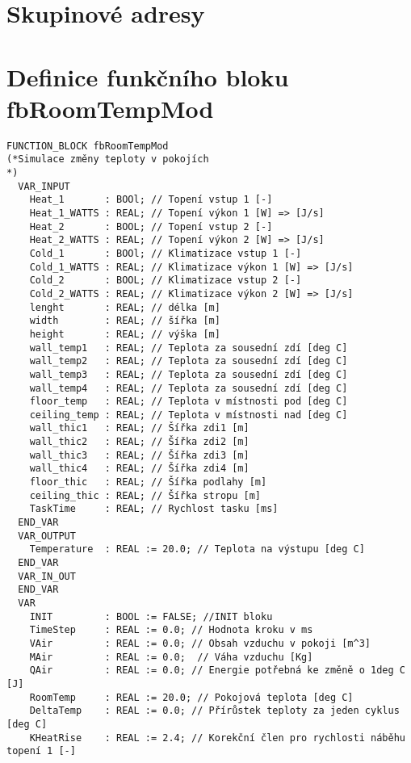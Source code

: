 \chapter{Skupinové adresy}




\chapter{Definice funkčního bloku fbRoomTempMod}
\begin{lstlisting}[language=ST]
FUNCTION_BLOCK fbRoomTempMod
(*Simulace změny teploty v pokojích
*)
  VAR_INPUT
    Heat_1       : BOOl; // Topení vstup 1 [-]
    Heat_1_WATTS : REAL; // Topení výkon 1 [W] => [J/s]
    Heat_2       : BOOL; // Topení vstup 2 [-]
    Heat_2_WATTS : REAL; // Topení výkon 2 [W] => [J/s]
    Cold_1       : BOOl; // Klimatizace vstup 1 [-]
    Cold_1_WATTS : REAL; // Klimatizace výkon 1 [W] => [J/s]
    Cold_2       : BOOL; // Klimatizace vstup 2 [-]
    Cold_2_WATTS : REAL; // Klimatizace výkon 2 [W] => [J/s]
    lenght       : REAL; // délka [m]
    width        : REAL; // šířka [m]
    height       : REAL; // výška [m]
    wall_temp1   : REAL; // Teplota za sousední zdí [deg C]
    wall_temp2   : REAL; // Teplota za sousední zdí [deg C]
    wall_temp3   : REAL; // Teplota za sousední zdí [deg C]
    wall_temp4   : REAL; // Teplota za sousední zdí [deg C]
    floor_temp   : REAL; // Teplota v místnosti pod [deg C]
    ceiling_temp : REAL; // Teplota v místnosti nad [deg C]
    wall_thic1   : REAL; // Šířka zdi1 [m]
    wall_thic2   : REAL; // Šířka zdi2 [m]
    wall_thic3   : REAL; // Šířka zdi3 [m]
    wall_thic4   : REAL; // Šířka zdi4 [m]
    floor_thic   : REAL; // Šířka podlahy [m]
    ceiling_thic : REAL; // Šířka stropu [m]
    TaskTime     : REAL; // Rychlost tasku [ms]
  END_VAR
  VAR_OUTPUT
    Temperature  : REAL := 20.0; // Teplota na výstupu [deg C]
  END_VAR
  VAR_IN_OUT
  END_VAR
  VAR
    INIT         : BOOL := FALSE; //INIT bloku
    TimeStep     : REAL := 0.0; // Hodnota kroku v ms
    VAir         : REAL := 0.0; // Obsah vzduchu v pokoji [m^3]
    MAir         : REAL := 0.0;  // Váha vzduchu [Kg]
    QAir         : REAL := 0.0; // Energie potřebná ke změně o 1deg C [J]
    RoomTemp     : REAL := 20.0; // Pokojová teplota [deg C]
    DeltaTemp    : REAL := 0.0; // Přírůstek teploty za jeden cyklus [deg C]
    KHeatRise    : REAL := 2.4; // Korekční člen pro rychlosti náběhu topení 1 [-]

\end{lstlisting}
